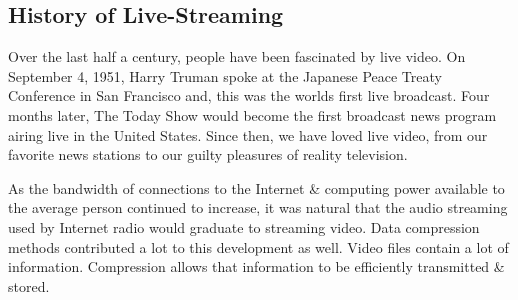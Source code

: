 \documentclass{article}
\begin{document}
%

\subsection{History of Live-Streaming}
Over the last half a century, people have been fascinated by live video. On September 4, 1951, Harry Truman spoke at the Japanese Peace Treaty Conference in San Francisco and, this was the worlds first live broadcast. Four months later, The Today Show would become the first broadcast news program airing live in the United States. Since then, we have loved live video, from our favorite news stations to our guilty pleasures of reality television.

As the bandwidth of connections to the Internet \& computing power available to the average person continued to increase, it was natural that the audio streaming used by Internet radio would graduate to streaming video. Data compression methods contributed a lot to this development as well. Video files contain a lot of information. Compression allows that information to be efficiently transmitted \& stored.
\end{document}

